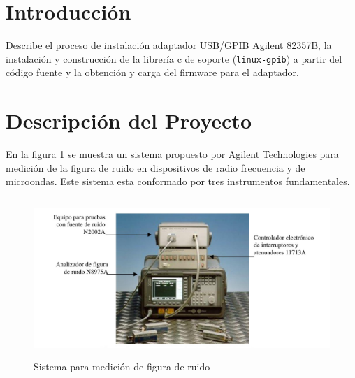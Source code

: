 \documentclass[paper=letter,oneside,fontsize=11pt, parskip=full]{scrartcl}
\begin{document}
	\clearpage
	
	\tableofcontents
		
	\section{Introducción}
		Describe el proceso de instalación adaptador USB/GPIB Agilent 82357B, la instalación y construcción de la librería c de soporte (\texttt{linux-gpib}) a partir del código fuente y la obtención y carga del firmware para el adaptador.
		
	\section{Descripción del Proyecto}
	
	En la figura \ref{Fig:SistemaMedicionFiguraRuido} se muestra un sistema propuesto por Agilent Technologies para medición de la figura de ruido en dispositivos de radio frecuencia y de microondas. Este sistema esta conformado por tres instrumentos fundamentales.
	
	\begin{figure}[!h]
		\begin{center}
			\includegraphics[height=6cm]{Imagenes/SistemaMedicionFiguraRuido.pdf}
			\caption{Sistema para medición de figura de ruido}
			\label{Fig:SistemaMedicionFiguraRuido}
		\end{center}	
	\end{figure}	
	
\end{document}
